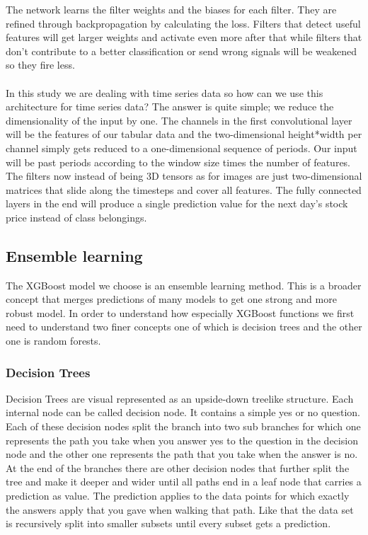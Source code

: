 \documentclass[a4paper,12pt]{report}
\begin{document}
	The network learns the filter weights and the biases for each filter. They are refined through backpropagation by calculating the loss. Filters that detect useful features will get larger weights and activate even more after that while filters that don’t contribute to a better classification or send wrong signals will be weakened so they fire less.\\\\
	In this study we are dealing with time series data so how can we use this architecture for time series data? The answer is quite simple; we reduce the dimensionality of the input by one. The channels in the first convolutional layer will be the features of our tabular data and the two-dimensional height*width per channel simply gets reduced to a one-dimensional sequence of periods. Our input will be past periods according to the window size times the number of features. The filters now instead of being 3D tensors as for images are just two-dimensional matrices that slide along the timesteps and cover all features. The fully connected layers in the end will produce a single prediction value for the next day’s stock price instead of class belongings.
	
	
	
	\subsection{Ensemble learning}
	The XGBoost model we choose is an ensemble learning method. This is a broader concept that merges predictions of many models to get one strong and more robust model. In order to understand how especially XGBoost functions we first need to understand two finer concepts one of which is decision trees and the other one is random forests.
	
	\subsubsection{Decision Trees}
	
	Decision Trees are visual represented as an upside-down treelike structure. Each internal node can be called decision node. It contains a simple yes or no question. Each of these decision nodes split the branch into two sub branches for which one represents the path you take when you answer yes to the question in the decision node and the other one represents the path that you take when the answer is no. At the end of the branches there are other decision nodes that further split the tree and make it deeper and wider until all paths end in a leaf node that carries a prediction as value. The prediction applies to the data points for which exactly the answers apply that you gave when walking that path. Like that the data set is recursively split into smaller subsets until every subset gets a prediction.
	
\end{document}
